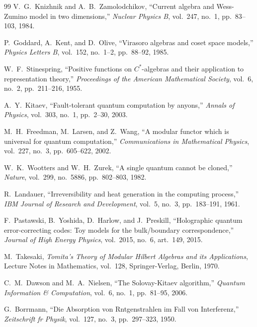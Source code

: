 \documentclass[11pt,onecolumn]{article}
\begin{document}
\FloatBarrier
\begin{thebibliography}{99}
V.~G.~Knizhnik and A.~B.~Zamolodchikov,
``Current algebra and Wess-Zumino model in two dimensions,''
\emph{Nuclear Physics B}, vol.~247, no.~1, pp.~83--103, 1984.

P.~Goddard, A.~Kent, and D.~Olive,
``Virasoro algebras and coset space models,''
\emph{Physics Letters B}, vol.~152, no.~1--2, pp.~88--92, 1985.

W.~F.~Stinespring,
``Positive functions on $C^*$-algebras and their application to representation theory,''
\emph{Proceedings of the American Mathematical Society}, vol.~6, no.~2, pp.~211--216, 1955.

A.~Y.~Kitaev,
``Fault-tolerant quantum computation by anyons,''
\emph{Annals of Physics}, vol.~303, no.~1, pp.~2--30, 2003.

M.~H.~Freedman, M.~Larsen, and Z.~Wang,
``A modular functor which is universal for quantum computation,''
\emph{Communications in Mathematical Physics}, vol.~227, no.~3, pp.~605--622, 2002.

W.~K.~Wootters and W.~H.~Zurek,
``A single quantum cannot be cloned,''
\emph{Nature}, vol.~299, no.~5886, pp.~802--803, 1982.

R.~Landauer,
``Irreversibility and heat generation in the computing process,''
\emph{IBM Journal of Research and Development}, vol.~5, no.~3, pp.~183--191, 1961.

F.~Pastawski, B.~Yoshida, D.~Harlow, and J.~Preskill,
``Holographic quantum error-correcting codes: Toy models for the bulk/boundary correspondence,''
\emph{Journal of High Energy Physics}, vol.~2015, no.~6, art.~149, 2015.

M.~Takesaki,
\emph{Tomita's Theory of Modular Hilbert Algebras and its Applications},
Lecture Notes in Mathematics, vol.~128, Springer-Verlag, Berlin, 1970.

C.~M.~Dawson and M.~A.~Nielsen,
``The Solovay-Kitaev algorithm,''
\emph{Quantum Information \& Computation}, vol.~6, no.~1, pp.~81--95, 2006.

G.~Borrmann,
``Die Absorption von Rntgenstrahlen im Fall von Interferenz,''
\emph{Zeitschrift fr Physik}, vol.~127, no.~3, pp.~297--323, 1950.


\end{thebibliography}
\end{document}
